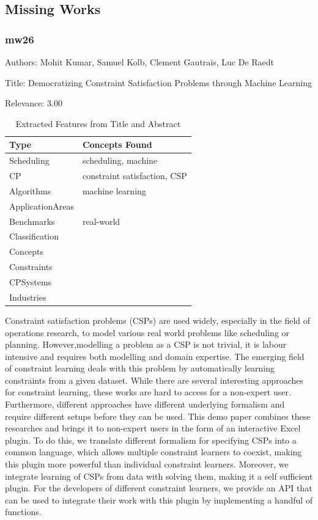 \subsection{Missing Works}

\subsubsection{mw26}
\label{mw:mw26}

Authors: Mohit Kumar, Samuel Kolb, Clement Gautrais, Luc De Raedt

Title: Democratizing Constraint Satisfaction Problems through Machine Learning

Relevance:  3.00

{\scriptsize
\begin{longtable}{p{2cm}p{20cm}}
\caption{Extracted Features from Title and Abstract}\\ \toprule
Type & Concepts Found\\ \midrule
\endhead
\bottomrule
\endfoot
Scheduling & scheduling, machine\\ 
CP & constraint satisfaction, CSP\\ 
Algorithms & machine learning\\ 
ApplicationAreas & \\ 
Benchmarks & real-world\\ 
Classification & \\ 
Concepts & \\ 
Constraints & \\ 
CPSystems & \\ 
Industries & \\ 
\end{longtable}
}

 Constraint satisfaction problems (CSPs) are used widely, especially in the field of operations research, to model various real world problems like scheduling or planning. However,modelling a problem as a CSP is not trivial, it is labour intensive and requires both modelling and domain expertise. The emerging field of constraint learning deals with this problem by automatically  learning constraints from a given dataset. While there are several interesting approaches for constraint learning, these works are hard to access for a non-expert user. Furthermore, different approaches have different underlying formalism and require different setups before  they can be used. This demo paper combines these researches and brings it to non-expert users in the form of an interactive Excel plugin. To do this, we translate different formalism for specifying CSPs into a common language, which allows multiple constraint learners to coexist, making this plugin more powerful than individual constraint learners. Moreover, we integrate learning of CSPs from data with solving them, making it a self sufficient plugin. For the developers of different constraint learners, we provide an API that can be used to integrate their work with this plugin by implementing a handful of functions. 

